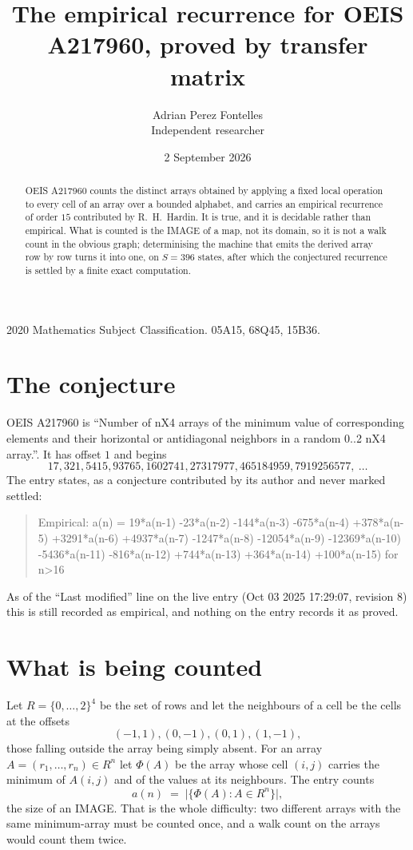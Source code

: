\documentclass[11pt,a4paper]{article}
\title{The empirical recurrence for OEIS A217960, proved by transfer matrix}
\author{Adrian Perez Fontelles\\ \small Independent researcher}
\date{2 September 2026}
\theoremstyle{plain}
\theoremstyle{definition}
\begin{document}
\maketitle

\begin{abstract}
OEIS A217960 counts the distinct arrays obtained by applying a fixed local operation to every cell
of an array over a bounded alphabet, and carries an empirical recurrence of order $15$
contributed by R.~H.~Hardin. It is true, and it is decidable rather than empirical. What is
counted is the IMAGE of a map, not its domain, so it is not a walk count in the obvious graph;
determinising the machine that emits the derived array row by row turns it into one, on
$S=396$ states, after which the conjectured recurrence is settled by a finite exact
computation.
\end{abstract}

\noindent\small 2020 Mathematics Subject Classification. 05A15, 68Q45, 15B36.\normalsize

\section{The conjecture}

OEIS A217960 is ``Number of nX4 arrays of the minimum value of corresponding elements and their horizontal or antidiagonal neighbors in a random 0..2 nX4 array.''. It has offset $1$ and begins
\[
17, 321, 5415, 93765, 1602741, 27317977, 465184959, 7919256577,\ \dots
\]
The entry states, as a conjecture contributed by its author and never marked settled:
\begin{quote}
Empirical: a(n) = 19*a(n-1) -23*a(n-2) -144*a(n-3) -675*a(n-4) +378*a(n-5) +3291*a(n-6) +4937*a(n-7) -1247*a(n-8) -12054*a(n-9) -12369*a(n-10) -5436*a(n-11) -816*a(n-12) +744*a(n-13) +364*a(n-14) +100*a(n-15) for n>16
\end{quote}
As of the ``Last modified'' line on the live entry (Oct 03 2025 17:29:07, revision 8) this is still
recorded as empirical, and nothing on the entry records it as proved.

\section{What is being counted}

Let $R=\{0,\dots,2\}^{4}$ be the set of rows and let the neighbours of
a cell be the cells at the offsets
\[
(-1,1), (0,-1), (0,1), (1,-1),
\]
those falling outside the array being simply absent. For an array
$A=(r_1,\dots,r_n)\in R^n$ let $\Phi(A)$ be the array whose cell $(i,j)$ carries the
minimum of $A(i,j)$ and of the values at its neighbours. The entry counts
\[
a(n)\;=\;\bigl|\{\Phi(A):A\in R^n\}\bigr| ,
\]
the size of an IMAGE. That is the whole difficulty: two different arrays with the same
minimum-array must be counted once, and a walk count on the arrays would count them twice.
\end{document}
